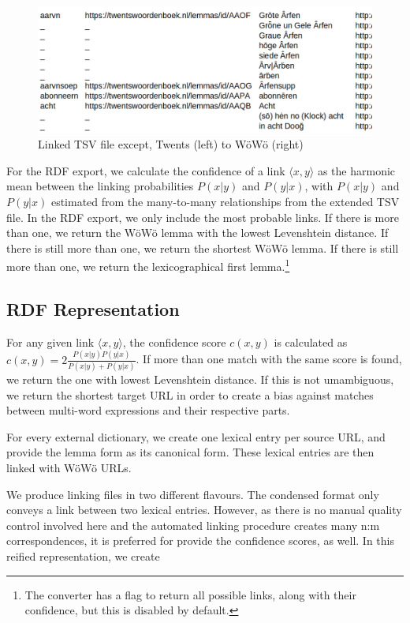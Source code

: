 \documentclass{article}
\begin{document}
\begin{figure}
    \centering
    \includegraphics[width=0.8\linewidth]{tsv-linked.png}
    \caption{Linked TSV file except, Twents (left) to WöWö (right)}
    \label{fig-twents-woewoe}
\end{figure}

For the RDF export, we calculate the confidence of a link $\langle x,y\rangle$ as the harmonic mean between the linking probabilities $P(x|y)$ and $P(y|x)$, with $P(x|y)$ and $P(y|x)$  estimated from the many-to-many relationships from the extended TSV file. In the RDF export, we only include the most probable links. If there is more than one, we return the WöWö lemma with the lowest Levenshtein distance. If there is still more than one, we return the shortest WöWö lemma. If there is still more than one, we return the lexicographical first lemma.\footnote{
    The converter has a flag to return all possible links, along with their confidence, but this is disabled by default.
}

\subsection{RDF Representation}

For any given link $\langle x,y\rangle$, the confidence score $c(x,y)$ is calculated as $c(x,y)=2 \frac{P(x|y) P(y|x)}{P(x|y) + P(y|x)}$. If more than one match with the same score is found, we return the one with lowest Levenshtein distance. If this is not umambiguous, we return the shortest target URL in order to create a bias against matches between multi-word expressions and their respective parts.

For every external dictionary, we create one lexical entry per source URL, and provide the lemma form as its canonical form. These lexical entries are then linked with WöWö URLs.

We produce linking files in two different flavours. The condensed format only conveys a  link between two lexical entries. 
However, as there is no manual quality control involved here and the automated linking procedure creates many n:m correspondences, it is preferred for provide the confidence scores, as well. In this reified representation, we create 
\end{document}
